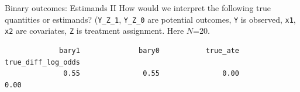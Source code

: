 \documentclass[
  ignorenonframetext,
]{beamer}
\newenvironment{Shaded}{\begin{snugshade}}{\end{snugshade}}
\newcommand{\AttributeTok}[1]{\textcolor[rgb]{0.77,0.63,0.00}{#1}}
\newcommand{\DecValTok}[1]{\textcolor[rgb]{0.00,0.00,0.81}{#1}}
\newcommand{\FunctionTok}[1]{\textcolor[rgb]{0.00,0.00,0.00}{#1}}
\newcommand{\NormalTok}[1]{#1}
\newcommand{\OtherTok}[1]{\textcolor[rgb]{0.56,0.35,0.01}{#1}}
\newcommand{\SpecialCharTok}[1]{\textcolor[rgb]{0.00,0.00,0.00}{#1}}
\begin{document}
\begin{frame}[fragile]{Binary outcomes: Estimands II}
\protect\hypertarget{binary-outcomes-estimands-ii}{}
How would we interpret the following true quantities or estimands?
(\texttt{Y\_Z\_1}, \texttt{Y\_Z\_0} are potential outcomes, \texttt{Y}
is observed, \texttt{x1}, \texttt{x2} are covariates, \texttt{Z} is
treatment assignment. Here \(N\)=20.

\scriptsize

\begin{Shaded}
\end{Shaded}

\begin{verbatim}
             bary1              bary0           true_ate true_diff_log_odds 
              0.55               0.55               0.00               0.00 
\end{verbatim}

\normalsize
\end{frame}
\end{document}
